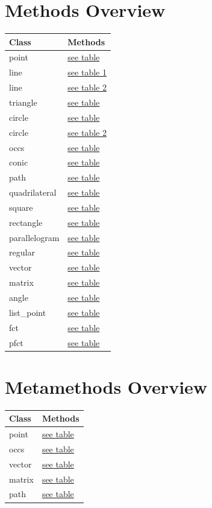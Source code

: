 \documentclass[
  DIV=16,
  fontsize=10,
  index=totoc,
  twoside,
  cadre,
  headings=small
]{tkz-doc}
\begin{document}
\section*{Methods Overview}
\begin{tabular}{ll}
\textbf{Class} & \textbf{Methods} \\
\hline
point         & \hyperref[point:methods]{see table}         \\
line          & \hyperref[line:methods part 1]{see table 1} \\
line          & \hyperref[line:methods part 2]{see table 2} \\
triangle      & \hyperref[triangle:methods]{see table}      \\
circle        & \hyperref[circle:methods]{see table}        \\
circle        & \hyperref[circle:methods 2]{see table 2}    \\
occs          & \hyperref[occs:methods]{see table}          \\
conic         & \hyperref[conic:methods]{see table}         \\
path          & \hyperref[path:methods]{see table}          \\
quadrilateral & \hyperref[quadrilateral:methods]{see table} \\
square        & \hyperref[square:methods]{see table}        \\
rectangle     & \hyperref[rectangle:methods]{see table}     \\
parallelogram & \hyperref[parallelogram:methods]{see table} \\
regular       & \hyperref[regular:methods]{see table}       \\
vector        & \hyperref[vector:methods]{see table}        \\
matrix        & \hyperref[matrix:methods]{see table}        \\
angle         & \hyperref[angle:methods]{see table}         \\
list\_point   & \hyperref[list_point:methods]{see table}    \\
fct           & \hyperref[fct:methods]{see table}           \\
pfct          & \hyperref[pfct:methods]{see table}          \\
\end{tabular}
\section*{Metamethods Overview}
\begin{tabular}{ll}
\textbf{Class} & \textbf{Methods} \\
\hline
point  & \hyperref[point:methods]{see table}  \\
occs   & \hyperref[occs:methods]{see table}   \\
vector & \hyperref[vector:methods]{see table} \\
matrix & \hyperref[matrix:methods]{see table} \\
path   & \hyperref[path:methods]{see table}   \\
\end{tabular}
\clearpage
\tableofcontents
\end{document}
